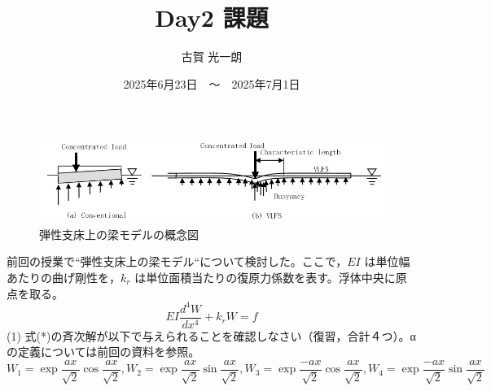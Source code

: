 \documentclass[dvipdfmx,a4paper]{jsarticle}
\title{Day2 課題}
\author{古賀 光一朗}
\date{2025年6月23日　～　2025年7月1日}
\begin{document}
    \maketitle
    \begin{figure}[H]
        \centering
        \includegraphics[width=0.7\linewidth]{summer/fluid-tructure-interactions/day2.01.png}
        \caption{弾性支床上の梁モデルの概念図}
        \label{fig:vlfs_concept}
    \end{figure}
    
    前回の授業で“弾性支床上の梁モデル“について検討した。ここで，$EI$ は単位幅あたりの曲げ剛性を，$k_r$ は単位面積当たりの復原力係数を表す。浮体中央に原点を取る。
    \begin{equation}
        EI\frac{d^4W}{dx^4}+k_rW=f \label{eq:beam_on_elastic_foundation}
    \end{equation}
    (1) 式(*)の斉次解が以下で与えられることを確認しなさい（復習，合計４つ）。αの定義については前回の資料を参照。
    \begin{equation}
        W_1 = \exp{\frac{ax}{\sqrt{2}}}\cos{\frac{ax}{\sqrt{2}}}, 
        W_2 = \exp{\frac{ax}{\sqrt{2}}}\sin{\frac{ax}{\sqrt{2}}}, 
        W_3 = \exp{\frac{-ax}{\sqrt{2}}}\cos{\frac{ax}{\sqrt{2}}}, 
        W_4 = \exp{\frac{-ax}{\sqrt{2}}}\sin{\frac{ax}{\sqrt{2}}}
    \end{equation}
\end{document}
